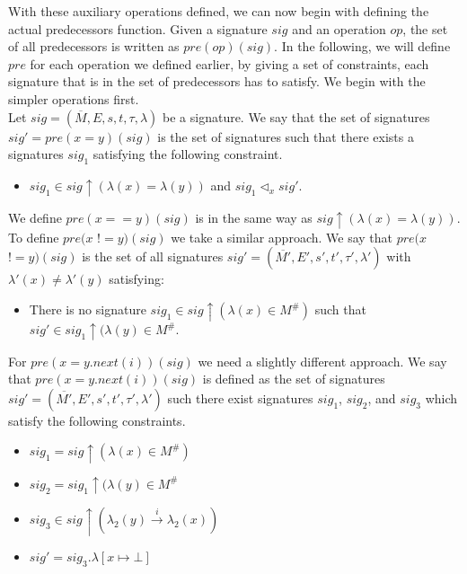 \noindent
With these auxiliary operations defined, we can now begin with defining the actual predecessors function. Given a signature $sig$
and an operation $op$, the set of all predecessors is written as $pre(op)(sig)$. In the following, we will define $pre$ for each 
operation we defined earlier, by giving a set of constraints, each signature that is in the set of predecessors has to satisfy.
We begin with the simpler operations first.\\
Let $sig = (\overline{M}, E, s, t, \tau, \lambda)$ be a signature. We say that the set of signatures \\
$sig' = pre(x = y)(sig)$ is the set of signatures such that there exists a signatures $sig_1$ satisfying the following constraint.

\begin{itemize}
	\item $sig_1 \in sig\uparrow(\lambda(x) = \lambda(y))$ and $sig_1 \vartriangleleft_x sig'$.
\end{itemize}

\noindent
We define $pre(x == y)(sig)$ is in the same way as $sig \uparrow(\lambda(x) = \lambda(y))$.\\
To define $pre(x$ $!= y)(sig)$ we take a similar approach. We say that $pre(x$ $!= y)(sig)$ is the set of all signatures
$sig' = (\overline{M'}, E', s', t', \tau', \lambda')$ with $\lambda'(x) \not=\lambda'(y)$ satisfying:

\begin{itemize}
	\item There is no signature $sig_1 \in sig\uparrow(\lambda(x) \in M^{\#})$ such that $sig' \in sig_1\uparrow(\lambda(y)\in M^{\#}$.
\end{itemize}

\noindent
For $pre(x = y.next(i))(sig)$ we need a slightly different approach. We say that $pre(x = y.next(i))(sig)$ is defined as the set
of signatures $sig' = (\overline{M'}, E', s', t', \tau', \lambda')$ such there exist signatures $sig_1$, $sig_2$, and $sig_3$ which
satisfy the following constraints.

\begin{itemize}
	\item $sig_1 = sig\uparrow(\lambda(x) \in M^{\#})$
	\item $sig_2 = sig_1\uparrow(\lambda(y) \in M^{\#}$
	\item $sig_3 \in sig\uparrow(\lambda_2(y) \xrightarrow{i} \lambda_2(x))$
	\item $sig' = sig_3.\lambda[x \mapsto \bot]$
\end{itemize}

